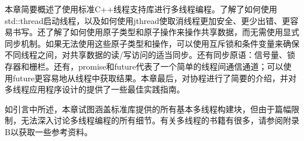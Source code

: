 本章简要概述了使用标准C++线程支持库进行多线程编程。了解了如何使用std::thread启动线程，以及如何使用jthread使取消线程更加安全、更少出错、更容易书写。还了解了如何使用原子类型和原子操作来操作共享数据，而无需使用显式同步机制。如果无法使用这些原子类型和操作，可以使用互斥锁和条件变量来确保不同线程之间，对共享数据的读/写访问的适当同步。还有同步原语：信号量、锁存器和栅栏。还有，promise和future代表了一个简单的线程间通信通道；可以使用future更容易地从线程中获取结果。本章最后，对协程进行了简要的介绍，并对多线程应用程序设计的提供了一些最佳实践指南。

如引言中所述，本章试图涵盖标准库提供的所有基本多线程构建块，但由于篇幅限制，无法深入讨论多线程编程的所有细节。有关多线程的书籍有很多，请参阅附录B以获取一些参考资料。
